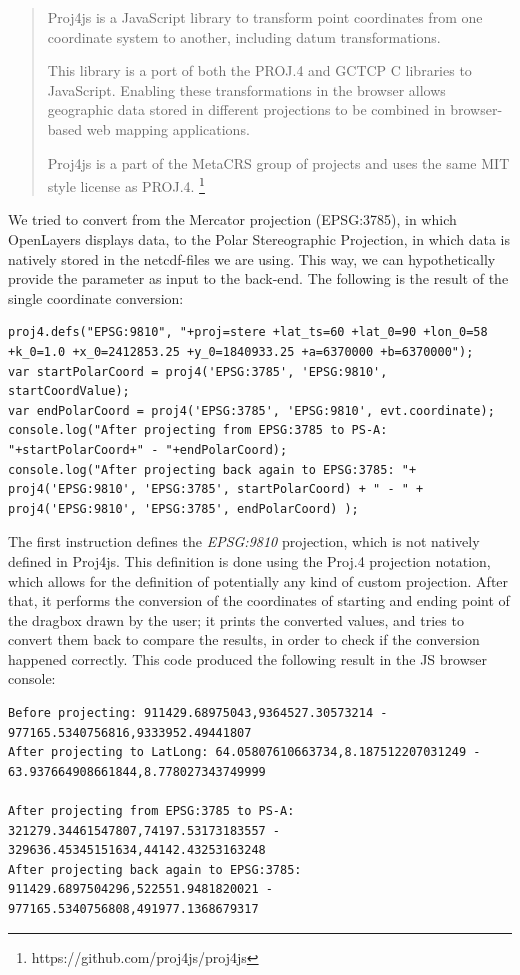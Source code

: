 \documentclass[11pt,a4paper,titlepage,oneside]{report}
\begin{document}
\begin{quote}
Proj4js is a JavaScript library to transform point coordinates from one coordinate system to another, including datum transformations.

This library is a port of both the  PROJ.4 and  GCTCP C libraries to JavaScript. Enabling these transformations in the browser allows geographic data stored in different projections to be combined in browser-based web mapping applications.

Proj4js is a part of the  MetaCRS group of projects and uses the same MIT style license as PROJ.4. \footnote{https://github.com/proj4js/proj4js}
\end{quote}

We tried to convert from the Mercator projection (EPSG:3785), in which OpenLayers displays data, to the Polar Stereographic Projection, in which data is natively stored in the \gls{netcdf}-files we are using. This way, we can hypothetically provide the parameter as input to the back-end.
The following is the result of the single coordinate conversion:

\begin{lstlisting}
proj4.defs("EPSG:9810", "+proj=stere +lat_ts=60 +lat_0=90 +lon_0=58 +k_0=1.0 +x_0=2412853.25 +y_0=1840933.25 +a=6370000 +b=6370000");
var startPolarCoord = proj4('EPSG:3785', 'EPSG:9810', startCoordValue);
var endPolarCoord = proj4('EPSG:3785', 'EPSG:9810', evt.coordinate);
console.log("After projecting from EPSG:3785 to PS-A: "+startPolarCoord+" - "+endPolarCoord);
console.log("After projecting back again to EPSG:3785: "+ proj4('EPSG:9810', 'EPSG:3785', startPolarCoord) + " - " + proj4('EPSG:9810', 'EPSG:3785', endPolarCoord) );
\end{lstlisting}

The first instruction defines the \textit{EPSG:9810} projection, which is not natively defined in Proj4js. This definition is done using the Proj.4 projection notation, which allows for the definition of potentially any kind of custom projection.
After that, it performs the conversion of the coordinates of starting and ending point of the dragbox drawn by the user; it prints the converted values, and tries to convert them back to compare the results, in order to check if the conversion happened correctly.
This code produced the following result in the JS browser console:
\begin{lstlisting}
Before projecting: 911429.68975043,9364527.30573214 - 977165.5340756816,9333952.49441807 
After projecting to LatLong: 64.05807610663734,8.187512207031249 - 63.937664908661844,8.778027343749999 

After projecting from EPSG:3785 to PS-A: 321279.34461547807,74197.53173183557 - 329636.45345151634,44142.43253163248
After projecting back again to EPSG:3785: 911429.6897504296,522551.9481820021 - 977165.5340756808,491977.1368679317 
\end{lstlisting}
\end{document}
